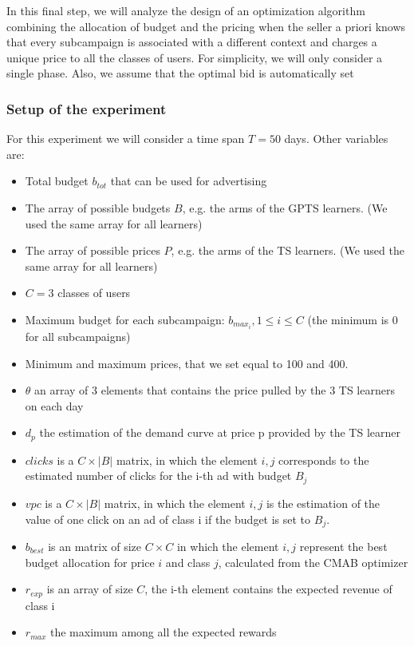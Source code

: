 In this final step, we will analyze the design of an optimization algorithm combining the allocation of budget and the pricing when the seller a priori knows that every subcampaign is associated with a different context and charges a unique price to all the classes of users.
For simplicity, we will only consider a single phase. Also, we assume that the optimal bid is automatically set

\subsubsection{Setup of the experiment}
For this experiment we will consider a time span $T=50$ days. Other variables are:
\begin{itemize}
    \item Total budget $b_{tot}$ that can be used for advertising
    \item The array of possible budgets $B$, e.g. the arms of the GPTS learners. (We used the same array for all learners)
    \item The array of possible prices $P$, e.g. the arms of the TS learners. (We used the same array for all learners)
    \item $C=3$ classes of users
    \item Maximum budget for each subcampaign: $b_{max_i}, 1 \leq i \leq C$ (the minimum is 0 for all subcampaigns)
    \item Minimum and maximum prices, that we set equal to 100 and 400.
    \item $\theta$ an array of 3 elements that contains the price pulled by the 3 TS learners on each day
    \item $d_p$ the estimation of the demand curve at price p provided by the TS learner
    \item $clicks$ is a $C \times |B|$ matrix, in which the element $i,j$ corresponds to the estimated number of clicks for the i-th ad with budget $B_j$
    \item $vpc$ is a $C \times |B|$ matrix, in which the element $i,j$ is the estimation of the value of one click on an ad of class i if the budget is set to $B_j$.
    \item $b_{best}$ is an matrix of size $C \times C$ in which the element $i,j$ represent the best budget allocation for price $i$ and class $j$, calculated from the CMAB optimizer
    \item $r_{exp}$ is an array of size $C$, the i-th element contains the expected revenue of class i
    \item $r_{max}$ the maximum among all the expected rewards
\end{itemize}

